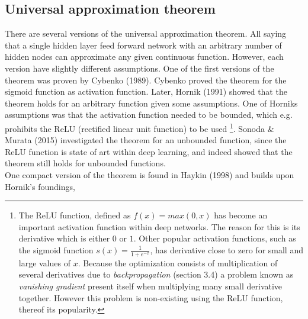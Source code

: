 \documentclass[12pt, letterpaper]{amsart}%
\begin{document}
\subsection{Universal approximation theorem}
There are several versions of the universal approximation theorem. All saying that a single hidden layer feed forward network with an arbitrary number of hidden nodes can approximate any given continuous function. However, each version have slightly different assumptions. One of the first versions of the theorem was proven by Cybenko (1989). Cybenko proved the theorem for the sigmoid function as activation function. Later, Hornik (1991) showed that the theorem holds for an arbitrary function given some assumptions. One of Horniks assumptions was that the activation function needed to be bounded, which e.g. prohibits the ReLU (rectified linear unit function) to be used \footnote{The ReLU function, defined as $f(x) = max(0,x)$ has become an important activation function within deep networks. The reason for this is its derivative which is either $0$ or $1$. Other popular activation functions, such as the sigmoid function $s(x) = \frac{1}{1 + e^{-x}}$, has derivative close to zero for small and large values of $x$. Because the optimization consists of multiplication of several derivatives due to \textit{backpropagation} (section 3.4) a problem known as \textit{vanishing gradient} present itself when multiplying many small derivative together. However this problem is non-existing using the ReLU function, thereof its popularity.}. Sonoda \& Murata (2015) investigated the theorem for an unbounded function, since the ReLU function is state of art within deep learning, and indeed showed that the theorem still holds for unbounded functions.
\\

One compact version of the theorem is found in Haykin (1998) and builds upon Hornik's foundings,

\newtheorem*{mydef}{Universal approximation theorem}
\end{document}
